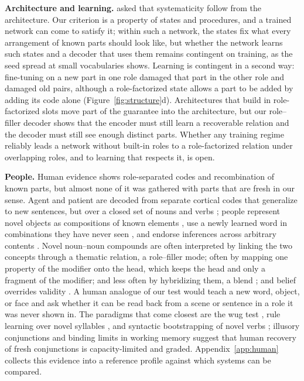 \documentclass[10pt]{article}
\theoremstyle{plain}
\theoremstyle{remark}
\begin{document}
\textbf{Architecture and learning.} \citet{fodor1990} asked that systematicity follow from the architecture. Our criterion is a property of states and procedures, and a trained network can come to satisfy it; within such a network, the states fix what every arrangement of known parts should look like, but whether the network learns such states and a decoder that uses them remains contingent on training, as the seed spread at small vocabularies shows. Learning is contingent in a second way: fine-tuning on a new part in one role damaged that part in the other role and damaged old pairs, although a role-factorized state allows a part to be added by adding its code alone (Figure~\ref{fig:structure}d). Architectures that build in role-factorized slots move part of the guarantee into the architecture, but our role--filler decoder shows that the encoder must still learn a recoverable relation and the decoder must still see enough distinct parts. Whether any training regime reliably leads a network without built-in roles to a role-factorized relation under overlapping roles, and to learning that respects it, is open.

\textbf{People.} Human evidence shows role-separated codes and recombination of known parts, but almost none of it was gathered with parts that are fresh in our sense. Agent and patient are decoded from separate cortical codes that generalize to new sentences, but over a closed set of nouns and verbs \citep{frankland2015}; people represent novel objects as compositions of known elements \citep{schwartenbeck2023}, use a newly learned word in combinations they have never seen \citep{lake2019}, and endorse inferences across arbitrary contents \citep{rips1994}. Novel noun--noun compounds are often interpreted by linking the two concepts through a thematic relation, a role--filler mode; often by mapping one property of the modifier onto the head, which keeps the head and only a fragment of the modifier; and less often by hybridizing them, a blend \citep{wisniewski1997}; and belief overrides validity \citep{evans1983}. A human analogue of our test would teach a new word, object, or face and ask whether it can be read back from a scene or sentence in a role it was never shown in. The paradigms that come closest are the wug test \citep{berko1958}, rule learning over novel syllables \citep{marcus1999}, and syntactic bootstrapping of novel verbs \citep{gleitman1990,naigles1990}; illusory conjunctions \citep{treisman1982} and binding limits in working memory \citep{wheeler2002} suggest that human recovery of fresh conjunctions is capacity-limited and graded. Appendix~\ref{app:human} collects this evidence into a reference profile against which systems can be compared.
\end{document}
